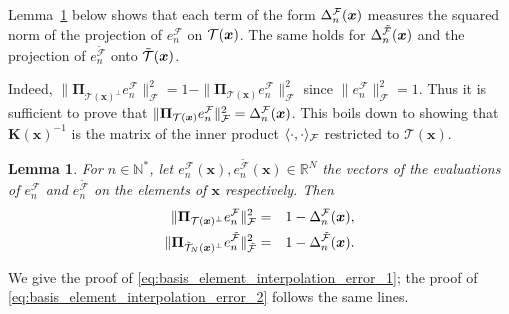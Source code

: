 \documentclass[twoside,11pt]{book}
\newtheorem{lemma}{Lemma}
\numberwithin{theorem}{chapter}
\numberwithin{definition}{chapter}
\numberwithin{proposition}{chapter}
\numberwithin{corollary}{chapter}
\numberwithin{example}{chapter}
\numberwithin{lemma}{chapter}
\numberwithin{assumption}{chapter}
\numberwithin{equation}{chapter}
\numberwithin{figure}{chapter}
\begin{document}
Lemma~\ref{lemma:interpolation_error_matricial_form} below shows that each term of the form $\Delta_n^{\cal F}(\bm{x})$ measures the squared norm of the projection of $e_{n}^{\mathcal{F}}$ on ${\cal T}(\bm{x})$. The same holds for $\Delta_n^{\tilde{\cal F}}(\bm{x})$ and the projection of $e_{n}^{\tilde{\mathcal{F}}}$ onto $\tilde{{\cal T}}(\bm{x})$.

Indeed, $\displaystyle \|\bm{\Pi}_{\mathcal{T}(\bm{x})^{\perp}}e_{n}^{\mathcal{F}}\|^{2}_{\mathcal{F}} = 1- \|\bm{\Pi}_{\mathcal{T}(\bm{x})}e_{n}^{\mathcal{F}}\|^{2}_{\mathcal{F}}$ since $\|e_{n}^{\mathcal{F}}\|^{2}_{\mathcal{F}} = 1$.
Thus it is sufficient to prove that $\|\bm{\Pi}_{\mathcal{T}(\bm{x})}e_{n}^{\mathcal{F}}\|^{2}_{\mathcal{F}} = \Delta_n^{\cal F}(\bm{x})$. This boils down to showing that $\bm{K}(\bm{x})^{-1}$ is the matrix of the inner product $\langle \cdot,\cdot \rangle_{\cal F}$ restricted to ${\mathcal{T}(\bm{x})}$.
\begin{lemma}\label{lemma:interpolation_error_matricial_form}
For $n \in \mathbb{N}^{*}$, let $e_{n}^{\mathcal{F}}(\bm{x}), e_{n}^{\tilde{\mathcal{F}}}(\bm{x})\in \mathbb{R}^{N}$ the vectors of the evaluations of $e_{n}^{\mathcal{F}}$ and $e_{n}^{\tilde{\mathcal{F}}}$ on the elements of $\bm{x}$ respectively. Then
\begin{eqnarray}
  \|\bm{\Pi}_{\mathcal{T}(\bm{x})^{\perp}}e_{n}^{\mathcal{F}}\|^{2}_{\mathcal{F}} & = & 1- \Delta_n^{\cal F}(\bm{x}), \label{eq:basis_element_interpolation_error_1}\\
  \|\bm{\Pi}_{\tilde{\mathcal{T}}_{N}(\bm{x})^{\perp}}e_{n}^{\tilde{\mathcal{F}}}\|^{2}_{\tilde{\mathcal{F}}} & = & 1- \Delta_n^{\tilde{\cal F}} (\bm{x}). \label{eq:basis_element_interpolation_error_2}
\end{eqnarray}
\end{lemma}\label{lemma:interpolation_error_kernel_formula}
We give the proof of \eqref{eq:basis_element_interpolation_error_1}; the proof of \eqref{eq:basis_element_interpolation_error_2} follows the same lines.
\end{document}
